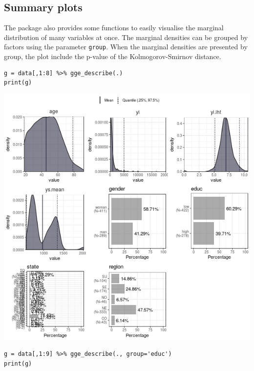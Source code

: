 \documentclass[a4paper]{article}
\begin{document}
\subsection{Summary plots}
\label{sec:org362dd88}

The package also provides some functions to easily visualise the marginal distribution of many variables at once. The marginal densities can be grouped by factors using the parameter \texttt{group}. When the marginal densities are presented by group, the plot include the p-value of the Kolmogorov-Smirnov distance.

\lstset{numbers=left,language=r,label= ,caption= ,captionpos=b}
\begin{lstlisting}
g = data[,1:8] %>% gge_describe(.)
print(g)
\end{lstlisting}

\begin{center}
\includegraphics[width=.9\linewidth]{gge_describe.png}
\end{center}



\lstset{numbers=left,language=r,label= ,caption= ,captionpos=b}
\begin{lstlisting}
g = data[,1:9] %>% gge_describe(., group='educ')
print(g)
\end{lstlisting}
\end{document}
